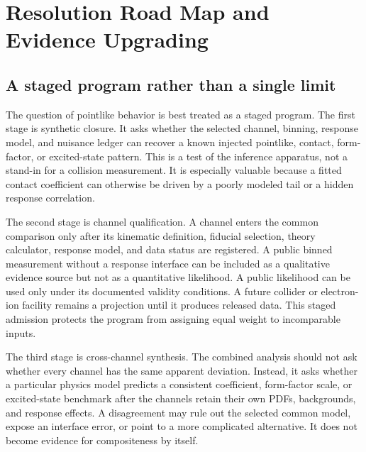 \section{Resolution Road Map and Evidence Upgrading}

\subsection{A staged program rather than a single limit}

The question of pointlike behavior is best treated as a staged program. The first stage is synthetic closure. It asks whether the selected channel, binning, response model, and nuisance ledger can recover a known injected pointlike, contact, form-factor, or excited-state pattern. This is a test of the inference apparatus, not a stand-in for a collision measurement. It is especially valuable because a fitted contact coefficient can otherwise be driven by a poorly modeled tail or a hidden response correlation.

The second stage is channel qualification. A channel enters the common comparison only after its kinematic definition, fiducial selection, theory calculator, response model, and data status are registered. A public binned measurement without a response interface can be included as a qualitative evidence source but not as a quantitative likelihood. A public likelihood can be used only under its documented validity conditions. A future collider or electron-ion facility remains a projection until it produces released data. This staged admission protects the program from assigning equal weight to incomparable inputs.

The third stage is cross-channel synthesis. The combined analysis should not ask whether every channel has the same apparent deviation. Instead, it asks whether a particular physics model predicts a consistent coefficient, form-factor scale, or excited-state benchmark after the channels retain their own PDFs, backgrounds, and response effects. A disagreement may rule out the selected common model, expose an interface error, or point to a more complicated alternative. It does not become evidence for compositeness by itself.

